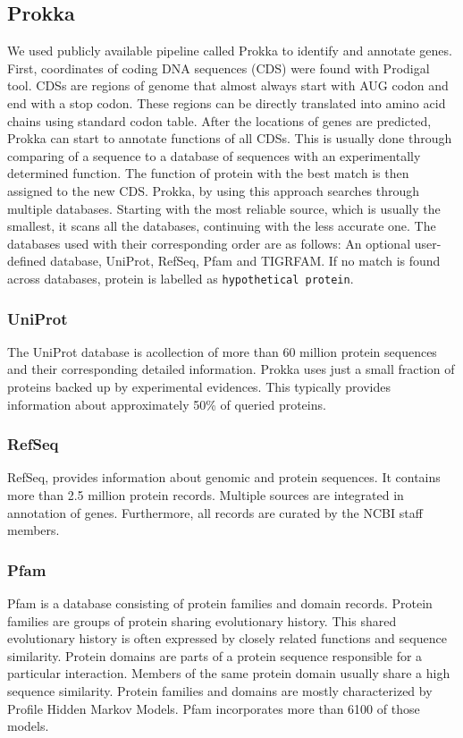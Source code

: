 \subsection{Prokka}
We used publicly available pipeline called  Prokka \cite{prokka} to identify and annotate genes.
First, coordinates of coding DNA sequences (CDS) were found with Prodigal tool\cite{prodigal}.
CDSs are regions of genome that almost always start with AUG codon and end with a stop codon.
These regions can be directly translated into amino acid chains using standard codon table.
After the locations of genes are predicted, Prokka can start to annotate functions of all CDSs.
This is usually done through comparing of a sequence to a database of sequences with an experimentally determined function.
The function of protein with the best match is then assigned to the new CDS.
Prokka, by using this approach searches through multiple databases.
Starting with the most reliable source, which is usually the smallest, it scans all the databases, continuing with the less accurate one.
The databases used with their corresponding order are as follows:
An optional user-defined database, UniProt\cite{uniprot}, RefSeq\cite{refseq}, Pfam\cite{pfam} and TIGRFAM\cite{tigrfam}.
If no match is found across databases, protein is labelled as \verb|hypothetical protein|.


\subsubsection{UniProt}
The UniProt database is acollection of more than 60 million protein sequences and their corresponding detailed information.
Prokka uses just a small fraction of proteins backed up by experimental evidences.
This typically provides information about approximately 50\% of queried proteins.

\subsubsection{RefSeq}
RefSeq, provides information about genomic and protein sequences.
It contains more than 2.5 million protein records.
Multiple sources are integrated in annotation of genes.
Furthermore, all records are curated by the NCBI staff members.

\subsubsection{Pfam}
Pfam is a database consisting of protein families and domain records.
Protein families are groups of protein sharing evolutionary history.
This shared evolutionary history is often expressed by closely related functions and sequence similarity.
Protein domains are parts of a protein sequence responsible for a particular interaction. 
Members of the same protein domain usually share a high sequence similarity.
Protein families and domains are mostly characterized by Profile Hidden Markov Models.
Pfam incorporates more than 6100 of those models.

